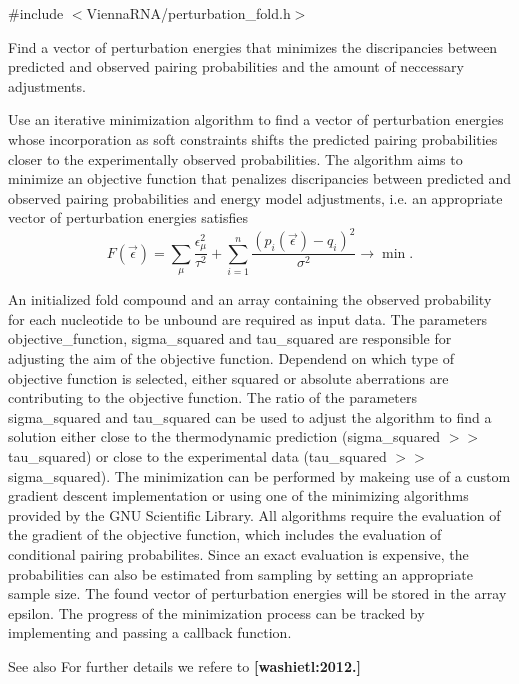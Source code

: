{\ttfamily \#include $<$Vienna\+R\+N\+A/perturbation\+\_\+fold.\+h$>$}



Find a vector of perturbation energies that minimizes the discripancies between predicted and observed pairing probabilities and the amount of neccessary adjustments. 

Use an iterative minimization algorithm to find a vector of perturbation energies whose incorporation as soft constraints shifts the predicted pairing probabilities closer to the experimentally observed probabilities. The algorithm aims to minimize an objective function that penalizes discripancies between predicted and observed pairing probabilities and energy model adjustments, i.\+e. an appropriate vector of perturbation energies satisfies \[ F(\vec\epsilon) = \sum_{\mu}{ \frac{\epsilon_{\mu}^2}{\tau^2} } + \sum_{i = 1}^n{ \frac{(p_i(\vec\epsilon) - q_i)^2}{\sigma^2} } \to \min. \]

An initialized fold compound and an array containing the observed probability for each nucleotide to be unbound are required as input data. The parameters objective\+\_\+function, sigma\+\_\+squared and tau\+\_\+squared are responsible for adjusting the aim of the objective function. Dependend on which type of objective function is selected, either squared or absolute aberrations are contributing to the objective function. The ratio of the parameters sigma\+\_\+squared and tau\+\_\+squared can be used to adjust the algorithm to find a solution either close to the thermodynamic prediction (sigma\+\_\+squared $>$$>$ tau\+\_\+squared) or close to the experimental data (tau\+\_\+squared $>$$>$ sigma\+\_\+squared). The minimization can be performed by makeing use of a custom gradient descent implementation or using one of the minimizing algorithms provided by the G\+N\+U Scientific Library. All algorithms require the evaluation of the gradient of the objective function, which includes the evaluation of conditional pairing probabilites. Since an exact evaluation is expensive, the probabilities can also be estimated from sampling by setting an appropriate sample size. The found vector of perturbation energies will be stored in the array epsilon. The progress of the minimization process can be tracked by implementing and passing a callback function.

\begin{DoxySeeAlso}{See also}
For further details we refere to {\bfseries [washietl\+:2012.]}
\end{DoxySeeAlso}

